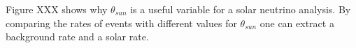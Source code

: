 Figure XXX shows why $\theta_{sun}$ is a useful variable for a solar neutrino analysis.
By comparing the rates of events with different values for $\theta_{sun}$ one can
extract a background rate and a solar rate.





